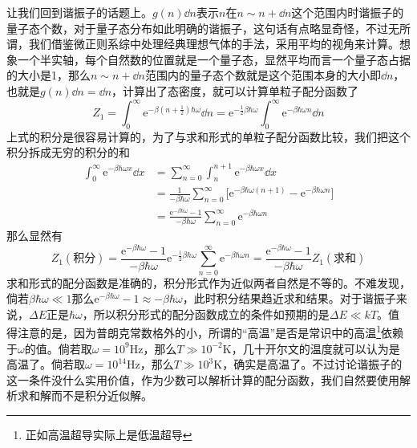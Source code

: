 \documentclass[../../main.tex]{subfiles}
\begin{document}
\begin{example}
\begin{solution}
        让我们回到谐振子的话题上。\(g(n)\dd n\)表示\(n\)在\(n\sim n+\dd n\)这个范围内时谐振子的量子态个数，对于量子态分布如此明确的谐振子，这句话有点略显奇怪，不过无所谓，我们借鉴微正则系综中处理经典理想气体的手法，采用平均的视角来计算。想象一个半实轴，每个自然数的位置就是一个量子态，显然平均而言一个量子态占据的大小是1，那么\(n\sim n+\dd n\)范围内的量子态个数就是这个范围本身的大小即\(\dd n\)，也就是\(g(n)\dd n=\dd n\)，计算出了态密度，就可以计算单粒子配分函数了
        \begin{equation}
            Z_1=\int_0^{\infty}\mathrm{e}^{-\beta\left(n+\frac{1}{2}\right)\hbar\omega}\dd n=\mathrm{e}^{-\frac{1}{2}\beta\hbar\omega}\int_0^{\infty}\mathrm{e}^{-\beta\hbar\omega n}\dd n
        \end{equation}
        上式的积分是很容易计算的，为了与求和形式的单粒子配分函数比较，我们把这个积分拆成无穷的积分的和
        \begin{equation}
            \begin{split}
                \int_0^{\infty}\mathrm{e}^{-\beta\hbar\omega x}\dd x&=\sum_{n=0}^{\infty}\int_n^{n+1}\mathrm{e}^{-\beta\hbar\omega x}\dd x\\
                &=\frac{1}{-\beta\hbar\omega}\sum_{n=0}^{\infty}\big[\mathrm{e}^{-\beta\hbar\omega (n+1)}-\mathrm{e}^{-\beta\hbar\omega n}\big] \\
                &=\frac{\mathrm{e}^{-\beta\hbar\omega}-1}{-\beta\hbar\omega}\sum_{n=0}^{\infty}\mathrm{e}^{-\beta\hbar\omega n}
            \end{split}
        \end{equation}
        那么显然有
        \begin{equation}
            Z_1(\text{积分})=\frac{\mathrm{e}^{-\beta\hbar\omega}-1}{-\beta\hbar\omega}\mathrm{e}^{-\frac{1}{2}\beta\hbar\omega}\sum_{n=0}^{\infty}\mathrm{e}^{-\beta\hbar\omega n}=\frac{\mathrm{e}^{-\beta\hbar\omega}-1}{-\beta\hbar\omega}Z_1(\text{求和})
        \end{equation}
        求和形式的配分函数是准确的，积分形式作为近似两者自然是不等的。不难发现，倘若\(\beta\hbar\omega\ll 1\)那么\(\mathrm{e}^{-\beta\hbar\omega}-1\approx-\beta\hbar\omega\)，此时积分结果趋近求和结果。对于谐振子来说，\(\Delta E\)正是\(\hbar\omega\)，所以积分形式的配分函数成立的条件如预期的是\(\Delta E\ll kT\)。值得注意的是，因为普朗克常数格外的小，所谓的“高温”是否是常识中的高温\footnote{正如高温超导实际上是低温超导}依赖于\(\omega\)的值。倘若取\(\omega=10^9 \text{Hz}\)，那么\(T\gg10^{-2}\text{K}\)，几十开尔文的温度就可以认为是高温了。倘若取\(\omega=10^{14} \text{Hz}\)，那么\(T\gg10^{3}\text{K}\)，确实是高温了。不过讨论谐振子的这一条件没什么实用价值，作为少数可以解析计算的配分函数，我们自然要使用解析求和解而不是积分近似解。
    \end{solution}
\end{example}
\end{document}
